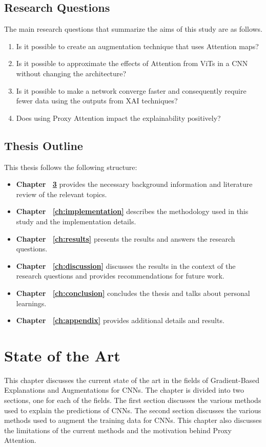 \documentclass[a4paper,11pt,openright]{book}
\begin{document}
\section{Research Questions} \label{section:researchq}
The main research questions that summarize the aims of this study are as follows.
\begin{enumerate}
    \item Is it possible to create an augmentation technique that uses Attention maps?
    \item Is it possible to approximate the effects of Attention from ViTs in a CNN without changing the architecture?
    \item Is it possible to make a network converge faster and consequently require fewer data using the outputs from XAI techniques?
    \item Does using Proxy Attention impact the explainability positively?
\end{enumerate}
\section{Thesis Outline}
This thesis follows the following structure:
\begin{itemize}
    \item \textbf{Chapter ~\ref{ch:sota}} provides the necessary background information and literature review of the relevant topics.
    \item \textbf{Chapter ~\ref{ch:implementation}} describes the methodology used in this study and the implementation details.
    \item \textbf{Chapter ~\ref{ch:results}} presents the results and answers the research questions.
    \item \textbf{Chapter ~\ref{ch:discussion}} discusses the results in the context of the research questions and provides recommendations for future work.
    \item \textbf{Chapter ~\ref{ch:conclusion}} concludes the thesis and talks about personal learnings.
    \item \textbf{Chapter ~\ref{ch:appendix}} provides additional details and results.
\end{itemize}

\chapter{State of the Art} \label{ch:sota}
This chapter discusses the current state of the art in the fields of Gradient-Based Explanations and Augmentations for CNNs. The chapter is divided into two sections, one for each of the fields. The first section discusses the various methods used to explain the predictions of CNNs. The second section discusses the various methods used to augment the training data for CNNs. This chapter also discusses the limitations of the current methods and the motivation behind Proxy Attention.
\end{document}

